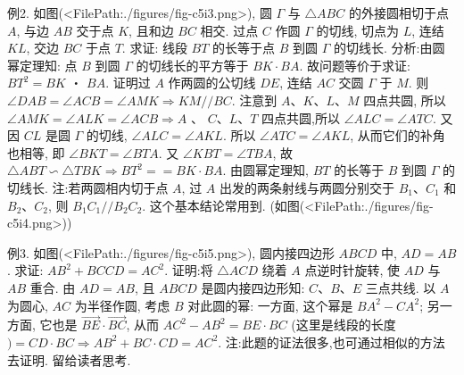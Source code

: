 例2. 如图(<FilePath:./figures/fig-c5i3.png>), 圆 $\Gamma$ 与 $\triangle A B C$ 的外接圆相切于点 $A$, 与边 $A B$ 交于点 $K$, 且和边 $B C$ 相交.
过点 $C$ 作圆 $\Gamma$ 的切线, 切点为 $L$, 连结 $K L$, 交边 $B C$ 于点 $T$. 求证: 线段 $B T$ 的长等于点 $B$ 到圆 $\Gamma$ 的切线长.
分析:由圆幂定理知: 点 $B$ 到圆 $\Gamma$ 的切线长的平方等于 $B K \cdot B A$. 故问题等价于求证: $B T^2=B K$ ・ $B A$.
证明过 $A$ 作两圆的公切线 $D E$, 连结 $A C$ 交圆 $\Gamma$ 于 $M$.
则 $\angle D A B=\angle A C B=\angle A M K \Rightarrow K M / / B C$.
注意到 $A 、 K 、 L 、 M$ 四点共圆, 所以 $\angle A M K=\angle A L K=\angle A C B \Rightarrow A$ 、 $C 、 L 、 T$ 四点共圆,所以 $\angle A L C=\angle A T C$.
又因 $C L$ 是圆 $\Gamma$ 的切线, $\angle A L C=\angle A K L$.
所以 $\angle A T C=\angle A K L$, 从而它们的补角也相等, 即 $\angle B K T=\angle B T A$. 又 $\angle K B T=\angle T B A$, 故 $\triangle A B T \backsim \triangle T B K \Rightarrow B T^2==B K \cdot B A$.
由圆幂定理知, $B T$ 的长等于 $B$ 到圆 $\Gamma$ 的切线长.
注:若两圆相内切于点 $A$, 过 $A$ 出发的两条射线与两圆分别交于 $B_1 、 C_1$ 和 $B_2 、 C_2$, 则 $B_1 C_1 / / B_2 C_2$. 这个基本结论常用到.
(如图(<FilePath:./figures/fig-c5i4.png>))



例3. 如图(<FilePath:./figures/fig-c5i5.png>), 圆内接四边形 $A B C D$ 中, $A D=A B$. 求证: $A B^2+B C C D=A C^2$.
证明:将 $\triangle A C D$ 绕着 $A$ 点逆时针旋转, 使 $A D$ 与 $A B$ 重合.
由 $A D=A B$, 且 $A B C D$ 是圆内接四边形知: $C 、 B 、 E$ 三点共线.
以 $A$ 为圆心, $A C$ 为半径作圆, 考虑 $B$ 对此圆的幂: 一方面, 这个幂是 $B A^2-C A^2$; 另一方面, 它也是 $\overrightarrow{B E} \cdot \overrightarrow{B C}$, 从而 $A C^2-A B^2=B E \cdot B C$ (这里是线段的长度 $)=C D \cdot B C \Rightarrow A B^2+B C \cdot C D=A C^2$.
注:此题的证法很多,也可通过相似的方法去证明.
留给读者思考.



